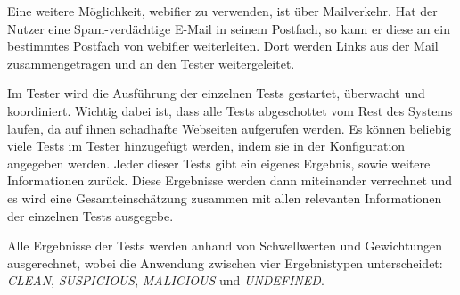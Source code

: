 Eine weitere Möglichkeit, webifier zu verwenden, ist über Mailverkehr.
Hat der Nutzer eine Spam-verdächtige E-Mail in seinem Postfach, so kann er diese an ein bestimmtes Postfach von webifier weiterleiten.
Dort werden Links  aus der Mail zusammengetragen und an den Tester weitergeleitet.

Im Tester wird die Ausführung der einzelnen Tests gestartet, überwacht und koordiniert.
Wichtig dabei ist, dass alle Tests abgeschottet vom Rest des Systems laufen, da auf ihnen schadhafte Webseiten aufgerufen werden.
Es können beliebig viele Tests im Tester hinzugefügt werden, indem sie in der Konfiguration angegeben werden.
Jeder dieser Tests gibt ein eigenes Ergebnis, sowie weitere Informationen zurück.
Diese Ergebnisse werden dann miteinander verrechnet und es wird eine Gesamteinschätzung zusammen mit allen relevanten Informationen der einzelnen Tests ausgegebe.

Alle Ergebnisse der Tests werden anhand von Schwellwerten und Gewichtungen ausgerechnet, wobei die Anwendung zwischen vier Ergebnistypen unterscheidet: \textit{CLEAN}, \textit{SUSPICIOUS}, \textit{MALICIOUS} und \textit{UNDEFINED}.

